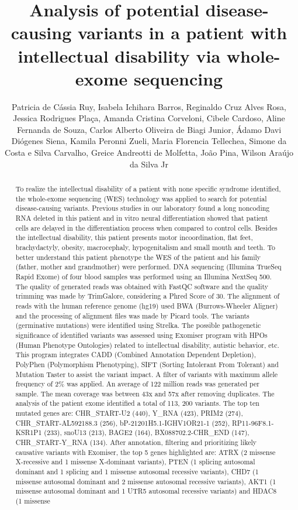\documentclass[twoside]{article}
\title{\vspace{-15mm}\fontsize{24pt}{10pt}\selectfont\textbf{ Analysis of potential disease-causing variants in a patient with intellectual disability via whole-exome sequencing }} %
\author{ Patricia de C\'assia Ruy, Isabela Ichihara Barros, Reginaldo Cruz Alves Rosa, Jessica Rodrigues Pla\c{c}a, Amanda Cristina Corveloni, Cibele Cardoso, Aline Fernanda de Souza, Carlos Alberto Oliveira de Biagi Junior, \'Adamo Davi Di\'ogenes Siena, Kamila Peronni Zueli, Maria Florencia Tellechea, Simone da Costa e Silva Carvalho, Greice Andreotti de Molfetta, Jo\~ao Pina, Wilson Ara\'ujo da Silva Jr }
\affil{ Faculty of Animal Science and Food Engineering of USP,  USP,  Brazil }
\date{}
\begin{document}
  
  
  \maketitle %
  
  
  \thispagestyle{fancy} %
  
  
  \begin{abstract}
  To realize the intellectual disability of a patient with none specific syndrome identified,  the whole-exome sequencing (WES) technology was applied to search for potential disease-causing variants. Previous studies in our laboratory found a long noncoding RNA deleted in this patient and in vitro neural differentiation showed that patient cells are delayed in the differentiation process when compared to control cells. Besides the intellectual disability,  this patient presents motor incoordination,  flat feet,  brachydactyly,  obesity,  macrocephaly,  hypogenitalism and small mouth and teeth.  To better understand this patient phenotype the WES of the patient and his family (father,  mother and grandmother) were performed. DNA sequencing (Illumina TrueSeq Rapid Exome) of four blood samples was performed using an Illumina NextSeq 500. The quality of generated reads was obtained with FastQC software and the quality trimming was made by TrimGalore,  considering a Phred Score of 30. The alignment of reads with the human reference genome (hg19) used BWA (Burrows-Wheeler Aligner) and the processing of alignment files was made by Picard tools.  The variants (germinative mutations) were identified using Strelka. The possible pathogenetic significance of identified variants was assessed using Exomiser program with HPOs (Human Phenotype Ontologies) related to intellectual disability,  autistic behavior,  etc. This program integrates CADD (Combined Annotation Dependent Depletion),  PolyPhen (Polymorphism Phenotyping),  SIFT (Sorting Intolerant From Tolerant) and Mutation Taster to assist the variant impact. A filter of variants with maximum allele frequency of 2\% was applied. An average of 122 million reads was generated per sample. The mean coverage was between 43x and 57x after removing duplicates. The analysis of the patient exome identified a total of 113, 200 variants. The top ten mutated genes are: CHR\_START-U2 (440),  Y\_RNA (423),  PRIM2 (274),  CHR\_START-AL592188.3 (256),  bP-21201H5.1-IGHV1OR21-1 (252),  RP11-96F8.1-KSR1P1 (233),  snoU13 (213),  BAGE2 (164),  BX088702.2-CHR\_END (147),  CHR\_START-Y\_RNA (134). After annotation,  filtering and prioritizing likely causative variants with Exomiser,  the top 5 genes highlighted are: ATRX (2 missense X-recessive and 1 missense X-dominant variants),  PTEN (1 splicing autosomal dominant and 1 splicing and 1 missense autosomal recessive variants),  CHD7 (1 missense autosomal dominant and 2 missense  autosomal recessive variants),  AKT1 (1 missense autosomal dominant and 1 UTR5  autosomal recessive variants) and HDAC8 (1 missense 
\end{abstract}
\end{document}
